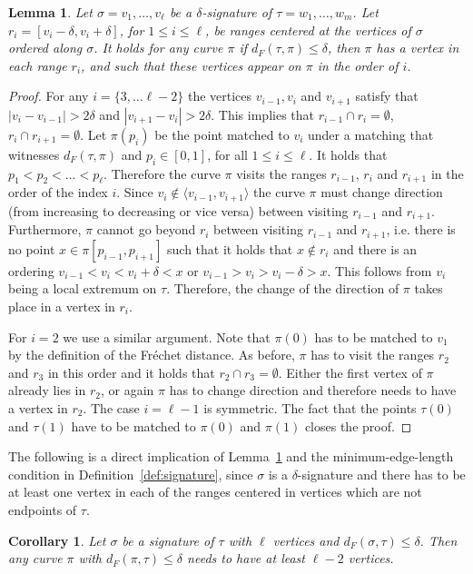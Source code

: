 \documentclass[11pt, letter]{article}
\newtheorem{lemma}[theorem]{Lemma}
\newtheorem{corollary}[theorem]{Corollary}
\newcommand{\lemlab}[1]{\label{lemma:#1}}
\newcommand{\lemref}[1]{Lemma~\ref{lemma:#1}}
\newcommand{\defref}[1]{Definition~\ref{def:#1}}
\newcommand{\corlab}[1]{\label{cor:#1}}
\newcommand{\Frechet}{Fr\'echet\xspace}
\providecommand{\pth}[2][\!]{#1\left({#2}\right)}
\newcommand{\lenClusters}{\ensuremath{\ell}}
\newcommand{\distFr}[2]{\ensuremath{d_F\pth{#1,#2}}}
\begin{document}
\begin{lemma}\lemlab{nec:suff}
Let $\sigma=v_1,\dots,v_\lenClusters$ be a $\delta$-signature of $\tau=w_1,\dots,w_m$. Let $r_i=[v_i-\delta,v_i+\delta]$,  for $1\leq i \leq \lenClusters$, be ranges centered at the vertices of $\sigma$ ordered along $\sigma$. It holds for any curve $\pi$ if $\distFr{\tau}{\pi}\leq\delta$, then $\pi$ has a vertex in each range $r_i$, and such that these vertices appear on $\pi$ in the order of $i$.
\end{lemma}

\begin{proof}
For any $i=\lbrace 3,\ldots \lenClusters-2\rbrace$ the vertices $v_{i-1}, v_i$ and $v_{i+1}$ satisfy that $|v_i-v_{i-1}|> 2\delta$ and $|v_{i+1}-v_{i}|> 2\delta$. This implies that $r_{i-1}\cap r_i = \emptyset$, $r_{i}\cap r_{i+1} = \emptyset$. 
Let $\pi(p_i)$ be the point matched to $v_i$ under a matching that witnesses $\distFr{\tau}{\pi}$ and $p_i\in [0,1]$, for all $1\leq i \leq \ell$. It holds that $p_1<p_2<\ldots <p_\ell$.
Therefore the curve $\pi$ visits the ranges $r_{i-1}$, $r_i$ and $r_{i+1}$ in the order of the index $i$. Since $v_i \notin \langle v_{i-1}, v_{i+1}\rangle $ the curve $\pi$ must change direction (from increasing to decreasing or vice versa) between visiting $r_{i-1}$ and $r_{i+1}$. Furthermore, $\pi$ cannot go beyond $r_i$ between visiting $r_{i-1}$ and $r_{i+1}$, i.e. there is no point $x\in\pi\left[p_{i-1}, p_{i+1} \right]$ such that it holds that $x\notin r_i$ and there is an ordering $v_{i-1}<v_i<v_i+\delta<x$ or $v_{i-1}>v_i>v_i-\delta>x$. This follows from $v_i$ being a local extremum on $\tau$. Therefore, the change of the direction of $\pi$ takes place in a vertex in $r_i$. 




For $i=2$ we use a similar argument. Note that $\pi(0)$ has to be matched to $v_1$ by the definition of the \Frechet distance. As before, $\pi$ has to visit the ranges $r_2$ and $r_3$ in this order and it holds that $r_2 \cap r_3 = \emptyset$. Either the first vertex of $\pi$ already lies in $r_2$, or again $\pi$ has to change direction and therefore needs to have a vertex in $r_2$. The case $i=\lenClusters-1$ is symmetric.  
The fact that the points $\tau(0)$ and $\tau(1)$ have to be matched to $\pi(0)$ and $\pi(1)$ closes the proof.
\end{proof}




The following is a direct implication of \lemref{nec:suff} and the minimum-edge-length condition in \defref{signature}, since $\sigma$ is a $\delta$-signature and there has to be at least one vertex in each of the ranges centered in vertices which are not endpoints of $\tau$. 
\begin{corollary}\corlab{nec:suff}
Let $\sigma$ be a signature of $\tau$ with $\lenClusters$ vertices and $\distFr{\sigma}{\tau}\leq \delta$. Then any curve $\pi$ with $\distFr{\pi}{\tau}\leq \delta$ needs to have at least $\lenClusters-2$ vertices.
\end{corollary}
\end{document}
